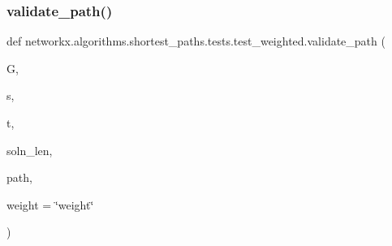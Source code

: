 \subsubsection{\texorpdfstring{validate\+\_\+path()}{validate\_path()}}
{\footnotesize\ttfamily def networkx.\+algorithms.\+shortest\+\_\+paths.\+tests.\+test\+\_\+weighted.\+validate\+\_\+path (\begin{DoxyParamCaption}\item[{}]{G,  }\item[{}]{s,  }\item[{}]{t,  }\item[{}]{soln\+\_\+len,  }\item[{}]{path,  }\item[{}]{weight = {\ttfamily \char`\"{}weight\char`\"{}} }\end{DoxyParamCaption})}

